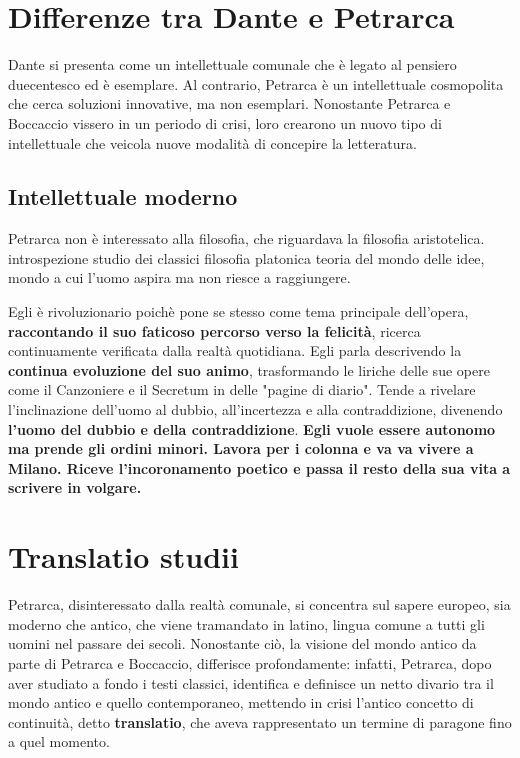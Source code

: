 \documentclass[10pt,a4paper]{article}
\begin{document}
\section{Differenze tra Dante e Petrarca}

Dante si presenta come un intellettuale comunale che è legato al pensiero duecentesco ed è esemplare. Al contrario, Petrarca è un intellettuale cosmopolita che cerca soluzioni innovative, ma non esemplari. Nonostante Petrarca e Boccaccio vissero in un periodo di crisi, loro crearono un nuovo tipo di intellettuale che veicola nuove modalità di concepire la letteratura.

\subsection{Intellettuale moderno}

 Petrarca non è interessato alla filosofia, che riguardava la filosofia aristotelica. introspezione studio dei classici filosofia platonica teoria del mondo delle idee, mondo a cui l'uomo aspira ma non riesce a raggiungere.

Egli è rivoluzionario poichè pone se stesso come tema principale dell'opera, \textbf{raccontando il suo faticoso percorso verso la felicità}, ricerca continuamente verificata dalla realtà quotidiana.
Egli parla descrivendo la \textbf{continua evoluzione del suo animo}, trasformando le liriche delle sue opere come il Canzoniere e il Secretum in delle "pagine di diario". 
Tende a rivelare l'inclinazione dell'uomo al dubbio, all'incertezza e alla contraddizione, divenendo \textbf{l'uomo del dubbio e della contraddizione}. \textbf{Egli vuole essere autonomo ma prende gli ordini minori. Lavora per i colonna e va va vivere a Milano. Riceve l'incoronamento poetico e passa il resto della sua vita a scrivere in volgare.}

\section{Translatio studii}

Petrarca, disinteressato dalla realtà comunale, si concentra sul sapere europeo, sia moderno che antico, che viene tramandato in latino, lingua comune a tutti gli uomini nel passare dei secoli. Nonostante ciò, la visione del mondo antico da parte di Petrarca e Boccaccio, differisce profondamente: infatti, Petrarca, dopo aver studiato a fondo i testi classici, identifica e definisce un netto divario tra il mondo antico e quello contemporaneo, mettendo in crisi l'antico concetto di continuità, detto \textbf{translatio}, che aveva rappresentato un termine di paragone fino a quel momento. 
\end{document}
